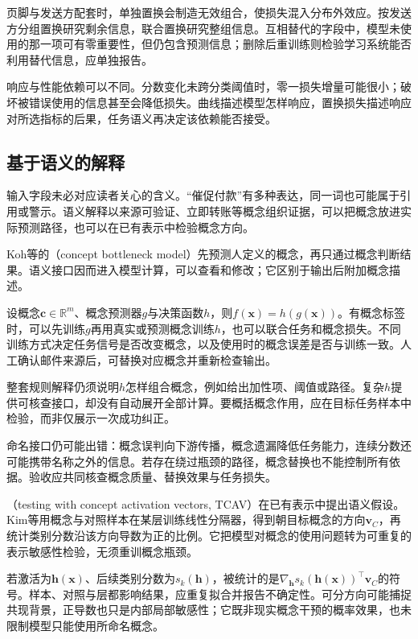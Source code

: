 页脚与发送方配套时，单独置换会制造无效组合，使损失混入分布外效应。按发送方分组置换研究剩余信息，联合置换研究整组信息。互相替代的字段中，模型未使用的那一项可有零重要性，但仍包含预测信息；删除后重训练则检验学习系统能否利用替代信息，应单独报告。

响应与性能依赖可以不同。分数变化未跨分类阈值时，零一损失增量可能很小；破坏被错误使用的信息甚至会降低损失。曲线描述模型怎样响应，置换损失描述响应对所选指标的后果，任务语义再决定该依赖能否接受。

\subsection{基于语义的解释}
\label{sec:interpretability-global-concepts}

输入字段未必对应读者关心的含义。“催促付款”有多种表达，同一词也可能属于引用或警示。语义解释以来源可验证、立即转账等概念组织证据，可以把概念放进实际预测路径，也可以在已有表示中检验概念方向。

Koh等的（concept bottleneck model）先预测人定义的概念，再只通过概念判断结果。语义接口因而进入模型计算，可以查看和修改；它区别于输出后附加概念描述。

设概念$\bm c\in\mathbb R^m$、概念预测器$g$与决策函数$h$，则$f(\bm x)=h(g(\bm x))$。有概念标签时，可以先训练$g$再用真实或预测概念训练$h$，也可以联合任务和概念损失。不同训练方式决定任务信号是否改变概念，以及使用时的概念误差是否与训练一致。人工确认邮件来源后，可替换对应概念并重新检查输出。

整套规则解释仍须说明$h$怎样组合概念，例如给出加性项、阈值或路径。复杂$h$提供可核查接口，却没有自动展开全部计算。要概括概念作用，应在目标任务样本中检验，而非仅展示一次成功纠正。

命名接口仍可能出错：概念误判向下游传播，概念遗漏降低任务能力，连续分数还可能携带名称之外的信息。若存在绕过瓶颈的路径，概念替换也不能控制所有依据。验收应共同核查概念质量、替换效果与任务损失。

（testing with concept activation vectors, TCAV）在已有表示中提出语义假设。Kim等用概念与对照样本在某层训练线性分隔器，得到朝目标概念的方向$\bm v_C$，再统计类别分数沿该方向导数为正的比例。它把模型对概念的使用问题转为可重复的表示敏感性检验，无须重训概念瓶颈。

若激活为$\bm h(\bm x)$、后续类别分数为$s_k(\bm h)$，被统计的是$\nabla_{\bm h}s_k(\bm h(\bm x))^\top\bm v_C$的符号。样本、对照与层都影响结果，应重复拟合并报告不确定性。可分方向可能捕捉共现背景，正导数也只是内部局部敏感性；它既非现实概念干预的概率效果，也未限制模型只能使用所命名概念。

